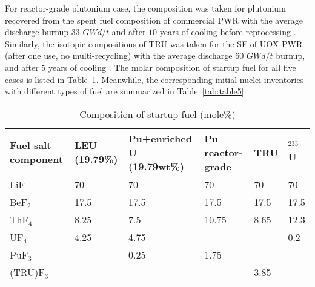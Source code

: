 For reactor-grade plutonium case, the composition was taken for plutonium 
recovered from the spent fuel composition of commercial \gls{PWR} with the 
average discharge burnup $33$ $GWd/t$ and after $10$ years of cooling before 
reprocessing \cite{oecd1989probabilistic,marka1993explosive}. Similarly, the 
isotopic compositions of \gls{TRU} was taken for the SF of UOX \gls{PWR} 
(after one use, no multi-recycling) with the average discharge $60$ 
$GWd/t$ burnup, and after $5$ years of cooling \cite{de2000scenarios}. 
The molar composition of startup fuel for all five cases is listed in 
Table~\ref{tab:table4}. Meanwhile, the corresponding initial nuclei 
inventories with different types of fuel are summarized in 
Table~\ref{tab:table5}.
\begin{table}  %
	\caption{Composition of startup fuel (mole\%)}
	\vspace{0.1in}
	\begin{tabularx}{\textwidth}{p{} X p{} 
	p{} X X}
		\hline
		Fuel salt component& \gls{LEU} (19.79\%) & Pu+enriched U (19.79wt\%) 
		& Pu reactor-grade & \gls{TRU}& $^{233}$U \\
		\hline
		LiF&70&70&70&70&70\\
		BeF$_2$&17.5&17.5&17.5&17.5&17.5\\
		ThF$_4$&8.25&7.5&10.75&	8.65&12.3		\\
		UF$_4$&4.25&4.75&&&	0.2		\\
		PuF$_3$&&0.25&1.75&&		\\
		(TRU)F$_3$&&&	&3.85	&\\
		\hline
	\end{tabularx}
	\label{tab:table4}
\end{table}

